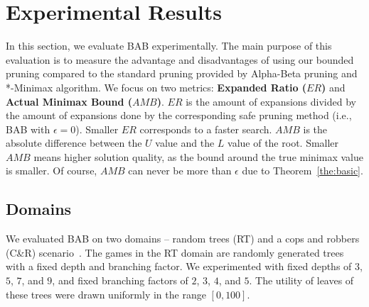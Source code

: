 \documentclass[runningheads]{llncs}
\newcommand{\pess}{\mathit{L}}
\newcommand{\opti}{\mathit{U}}
\newcommand{\amb}{\mathit{AMB}}
\newcommand{\er}{\mathit{ER}}
\begin{document}





\section{Experimental Results}

In this section, we evaluate BAB experimentally. 
The main purpose of this evaluation is to measure the advantage and disadvantages of using our bounded pruning compared to the standard pruning provided by Alpha-Beta pruning and *-Minimax algorithm. We focus on two metrics: {\bf Expanded Ratio ($\er$)} and {\bf Actual Minimax Bound ($\amb$)}. $\er$ is the amount of expansions divided by the amount of expansions done by the corresponding safe pruning method (i.e., BAB with $\epsilon=0$). Smaller $\er$ corresponds to a faster search. 
$\amb$ is the absolute difference between the $\opti$ value and the $\pess$ value of the root. Smaller $\amb$ means higher solution quality, as the bound around the true minimax value is smaller. Of course, $\amb$ can never be more than $\epsilon$ due to Theorem~\ref{the:basic}.




\subsection{Domains}
We evaluated BAB on two domains -- random trees (RT) and a cops and robbers (C\&R) scenario~\cite{moldenhauer2009evaluating}. The games in the RT domain are randomly generated trees with a fixed depth and branching factor. We experimented with 
fixed depths of $3$, $5$, $7$, and $9$, and fixed branching factors of $2$, $3$, $4$, and $5$. 
The utility of leaves of these trees were drawn uniformly in the range $[0, 100]$. 
\end{document}
